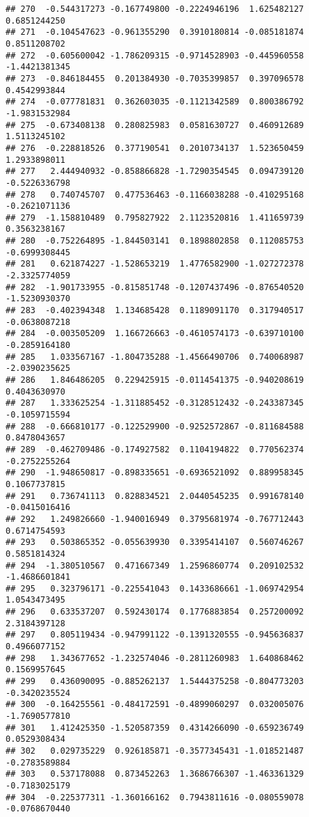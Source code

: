 \documentclass[
]{article}
\begin{document}
\begin{verbatim}
## 270  -0.544317273 -0.167749800 -0.2224946196  1.625482127  0.6851244250
## 271  -0.104547623 -0.961355290  0.3910180814 -0.085181874  0.8511208702
## 272  -0.605600042 -1.786209315 -0.9714528903 -0.445960558 -1.4421381345
## 273  -0.846184455  0.201384930 -0.7035399857  0.397096578  0.4542993844
## 274  -0.077781831  0.362603035 -0.1121342589  0.800386792 -1.9831532984
## 275  -0.673408138  0.280825983  0.0581630727  0.460912689  1.5113245102
## 276  -0.228818526  0.377190541  0.2010734137  1.523650459  1.2933898011
## 277   2.444940932 -0.858866828 -1.7290354545  0.094739120 -0.5226336798
## 278   0.740745707  0.477536463 -0.1166038288 -0.410295168 -0.2621071136
## 279  -1.158810489  0.795827922  2.1123520816  1.411659739  0.3563238167
## 280  -0.752264895 -1.844503141  0.1898802858  0.112085753 -0.6999308445
## 281   0.621874227 -1.528653219  1.4776582900 -1.027272378 -2.3325774059
## 282  -1.901733955 -0.815851748 -0.1207437496 -0.876540520 -1.5230930370
## 283  -0.402394348  1.134685428  0.1189091170  0.317940517 -0.0638087218
## 284  -0.003505209  1.166726663 -0.4610574173 -0.639710100 -0.2859164180
## 285   1.033567167 -1.804735288 -1.4566490706  0.740068987 -2.0390235625
## 286   1.846486205  0.229425915 -0.0114541375 -0.940208619  0.4043630970
## 287   1.333625254 -1.311885452 -0.3128512432 -0.243387345 -0.1059715594
## 288  -0.666810177 -0.122529900 -0.9252572867 -0.811684588  0.8478043657
## 289  -0.462709486 -0.174927582  0.1104194822  0.770562374 -0.2752255264
## 290  -1.948650817 -0.898335651 -0.6936521092  0.889958345  0.1067737815
## 291   0.736741113  0.828834521  2.0440545235  0.991678140 -0.0415016416
## 292   1.249826660 -1.940016949  0.3795681974 -0.767712443  0.6714754593
## 293   0.503865352 -0.055639930  0.3395414107  0.560746267  0.5851814324
## 294  -1.380510567  0.471667349  1.2596860774  0.209102532 -1.4686601841
## 295   0.323796171 -0.225541043  0.1433686661 -1.069742954  1.0543473495
## 296   0.633537207  0.592430174  0.1776883854  0.257200092  2.3184397128
## 297   0.805119434 -0.947991122 -0.1391320555 -0.945636837  0.4966077152
## 298   1.343677652 -1.232574046 -0.2811260983  1.640868462  0.1569957645
## 299   0.436090095 -0.885262137  1.5444375258 -0.804773203 -0.3420235524
## 300  -0.164255561 -0.484172591 -0.4899060297  0.032005076 -1.7690577810
## 301   1.412425350 -1.520587359  0.4314266090 -0.659236749  0.0529308434
## 302   0.029735229  0.926185871 -0.3577345431 -1.018521487 -0.2783589884
## 303   0.537178088  0.873452263  1.3686766307 -1.463361329 -0.7183025179
## 304  -0.225377311 -1.360166162  0.7943811616 -0.080559078 -0.0768670440

\end{verbatim}
\end{document}
